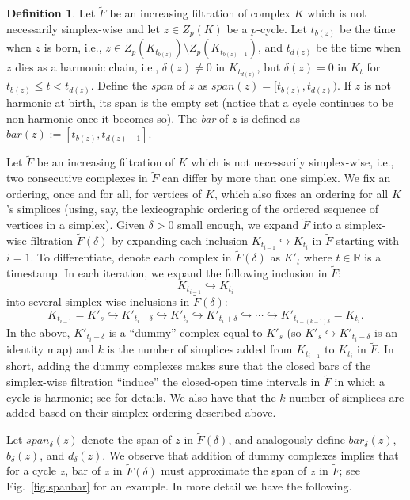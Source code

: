 \documentclass[10pt,a4paper]{amsart}
\theoremstyle{definition}
\newcommand{\incto}{\hookrightarrow}
\newtheorem{definition}[theorem]{Definition}
\theoremstyle{remark}
\begin{document}
\begin{definition}\label{dfn:bd-span-bar2}
Let $\tilde{F}$ be an increasing filtration of complex $K$ which is not necessarily simplex-wise and let $z \in Z_p(K)$ be a $p$-cycle. 
Let $t_{b(z)}$ be the time when $z$ is born,  i.e., $z\in Z_p(K_{t_{b(z)}})\setminus Z_p(K_{t_{b(z)-1}})$, and $t_{d(z)}$ be the time when $z$ dies as a harmonic chain, i.e., $\delta(z)\neq 0 $ in $K_{t_{d(z)}}$, but $\delta(z)=0$ in $K_t$ for $t_{b(z)} \leq t < t_{d(z)}$. Define the \emph{span} of $z$ as $span(z)=[t_{b(z)}, t_{d(z)})$.  If $z$ is not harmonic at birth, its span is the empty set (notice that a cycle  continues to be non-harmonic once it becomes so).
    The \emph{bar} of $z$ is defined as $bar(z) := [t_{b(z)}, t_{d(z)-1}]$.
\end{definition}


Let $\tilde{F}$ be an increasing filtration of $K$ which is not necessarily simplex-wise, i.e., two consecutive complexes in $\tilde{F}$ can differ by more than one simplex. We fix an ordering, once and for all, for vertices of $K$, which also fixes an ordering for all $K$'s simplices (using, say, the lexicographic ordering of the ordered sequence of vertices in a simplex). Given $\delta>0$ small enough, 
we expand $\tilde{F}$ into a simplex-wise filtration $\tilde{F}(\delta)$
by  expanding each inclusion $K_{t_{i-1}}\incto K_{t_{i}}$
in $\tilde{F}$
starting with $i=1$.
To differentiate,
 denote each complex in $\tilde{F}(\delta)$
as $K'_t$ where $t\in\mathbb{R}$ is a timestamp.
In each iteration, we expand the following inclusion in $\tilde{F}$:
$$K_{t_{i-1}} \incto K_{t_i} 
$$ 
 into  several simplex-wise inclusions in $\tilde{F}(\delta)$: 
$$  K_{t_{i-1}}=K'_{s} \incto K'_{t_i-\delta} \incto K'_{t_i}\incto K'_{t_i +\delta} \incto \cdots \incto K'_{t_{i+(k-1)\delta}} =K_{t_i}.
$$ 
In the above, $K'_{t_i-\delta}$ is a ``dummy'' complex equal to $K'_{s}$
(so $K'_{s} \incto K'_{t_i-\delta}$ is an identity map)
and $k$ is the number of simplices added from $K_{t_{i-1}}$ to $K_{t_i}$ in $\tilde{F}$.
In short, adding the dummy complexes makes sure that the closed bars of the simplex-wise filtration 
``induce''
the closed-open time intervals in $\tilde{F}$ in which a cycle is harmonic; see  for details.
We also have that the $k$ number of simplices are added based on
their simplex ordering described above.

    
Let $span_{\delta}(z)$ denote the span of $z$ in $\tilde{F}(\delta)$, and analogously define $bar_{\delta}(z)$, $b_{\delta}(z)$, and $d_{\delta}(z)$. We observe that addition of dummy complexes implies that for a cycle $z$, bar of $z$ in $\tilde{F}(\delta)$ must approximate the span of $z$ in $\tilde{F}$; see Fig.~\ref{fig:spanbar} for an example. In more detail we have the following.
\end{document}
